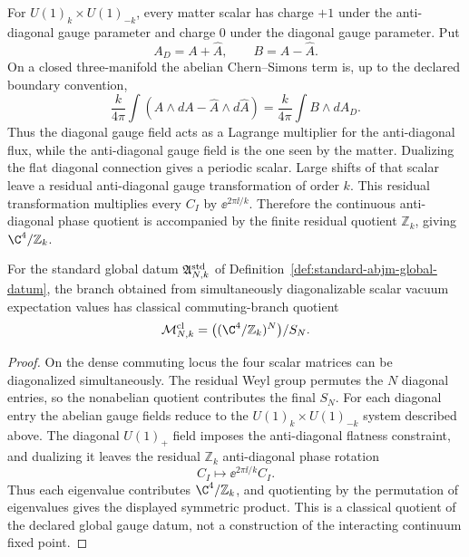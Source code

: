 For \(U(1)_k\times U(1)_{-k}\), every matter scalar has charge \(+1\) under
the anti-diagonal gauge parameter and charge \(0\) under the diagonal gauge
parameter.  Put
\[
  A_D=A+\widehat A,\qquad B=A-\widehat A .
\]
On a closed three-manifold the abelian Chern--Simons term is, up to the
declared boundary convention,
\begin{equation}
  \frac{k}{4\pi}\int(A\wedge dA-\widehat A\wedge d\widehat A)
  =
  \frac{k}{4\pi}\int B\wedge dA_D .
  \label{eq:abjm-abelian-bf-term}
\end{equation}
Thus the diagonal gauge field acts as a Lagrange multiplier for the
anti-diagonal flux, while the anti-diagonal gauge field is the one seen by
the matter.  Dualizing the flat diagonal connection gives a periodic scalar.
Large shifts of that scalar leave a residual anti-diagonal gauge
transformation of order \(k\).  This residual transformation multiplies every
\(C_I\) by \(\ee^{2\pi\ii/k}\).  Therefore the continuous anti-diagonal
phase quotient is accompanied by the finite residual quotient
\(\mathbb Z_k\), giving \(\C^4/\mathbb Z_k\).

\begin{proposition}
\label{prop:abjm-classical-commuting-branch-quotient}
For the standard global datum
\(\mathfrak A^{\rm std}_{N,k}\) of
Definition~\ref{def:standard-abjm-global-datum}, the branch obtained from
simultaneously diagonalizable scalar vacuum expectation values has classical
commuting-branch quotient
\[
  \mathcal M_{N,k}^{\rm cl}
  =
  \bigl((\C^4/\mathbb Z_k)^N\bigr)/S_N .
\]
\end{proposition}

\begin{proof}
On the dense commuting locus the four scalar matrices can be diagonalized
simultaneously.  The residual Weyl group permutes the \(N\) diagonal entries,
so the nonabelian quotient contributes the final \(S_N\).  For each diagonal
entry the abelian gauge fields reduce to the \(U(1)_k\times U(1)_{-k}\)
system described above.  The diagonal \(U(1)_+\) field imposes the
anti-diagonal flatness constraint, and dualizing it leaves the residual
\(\mathbb Z_k\) anti-diagonal phase rotation
\[
  C_I\longmapsto \ee^{2\pi\ii/k}C_I .
\]
Thus each eigenvalue contributes \(\C^4/\mathbb Z_k\), and quotienting by the
permutation of eigenvalues gives the displayed symmetric product.  This is a
classical quotient of the declared global gauge datum, not a construction of
the interacting continuum fixed point.
\end{proof}

